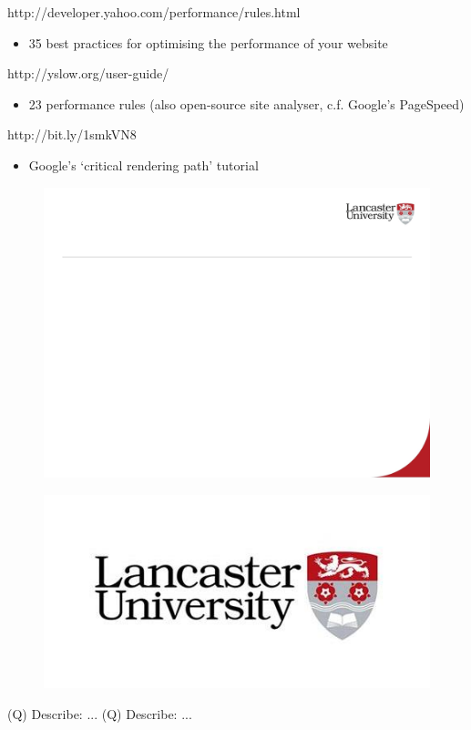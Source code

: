 \documentclass[12pt]{article}
\begin{document}
  \item http://developer.yahoo.com/performance/rules.html
\begin{itemize}
  \item 35 best practices for optimising the performance of your website
\end{itemize}
  \item http://yslow.org/user-guide/
\begin{itemize}
  \item 23 performance rules (also open-source site analyser, c.f. Google’s PageSpeed)
\end{itemize}
  \item http://bit.ly/1smkVN8
\begin{itemize}
  \item Google’s ‘critical rendering path’ tutorial
\end{itemize}
\begin{figure}[H]
\includegraphics[width=0.5\linewidth]{page91-image-1.png}
\end{figure}
\begin{figure}[H]
\includegraphics[width=0.5\linewidth]{page91-image-2.png}
\end{figure}
\clearpage
(Q)
Describe: ...
\clearpage
\clearpage
(Q)
Describe: ...
\clearpage
\\
\end{document}
